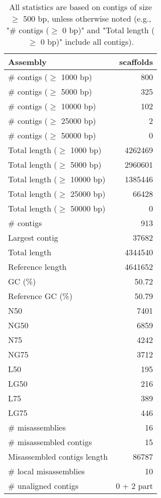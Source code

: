 \documentclass[12pt,a4paper]{article}
\begin{document}
\begin{table}[ht]
\begin{center}
\caption{All statistics are based on contigs of size $\geq$ 500 bp, unless otherwise noted (e.g., "\# contigs ($\geq$ 0 bp)" and "Total length ($\geq$ 0 bp)" include all contigs).}
\begin{tabular}{|l*{1}{|r}|}
\hline
Assembly & scaffolds \\ \hline
\# contigs ($\geq$ 1000 bp) & 800 \\ \hline
\# contigs ($\geq$ 5000 bp) & 325 \\ \hline
\# contigs ($\geq$ 10000 bp) & 102 \\ \hline
\# contigs ($\geq$ 25000 bp) & 2 \\ \hline
\# contigs ($\geq$ 50000 bp) & 0 \\ \hline
Total length ($\geq$ 1000 bp) & 4262469 \\ \hline
Total length ($\geq$ 5000 bp) & 2960601 \\ \hline
Total length ($\geq$ 10000 bp) & 1385446 \\ \hline
Total length ($\geq$ 25000 bp) & 66428 \\ \hline
Total length ($\geq$ 50000 bp) & 0 \\ \hline
\# contigs & 913 \\ \hline
Largest contig & 37682 \\ \hline
Total length & 4344540 \\ \hline
Reference length & 4641652 \\ \hline
GC (\%) & 50.72 \\ \hline
Reference GC (\%) & 50.79 \\ \hline
N50 & 7401 \\ \hline
NG50 & 6859 \\ \hline
N75 & 4242 \\ \hline
NG75 & 3712 \\ \hline
L50 & 195 \\ \hline
LG50 & 216 \\ \hline
L75 & 389 \\ \hline
LG75 & 446 \\ \hline
\# misassemblies & 16 \\ \hline
\# misassembled contigs & 15 \\ \hline
Misassembled contigs length & 86787 \\ \hline
\# local misassemblies & 10 \\ \hline
\# unaligned contigs & 0 + 2 part \\ \hline

\end{tabular}
\end{center}
\end{table}
\end{document}
